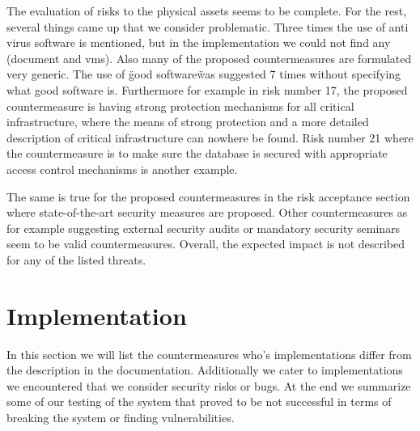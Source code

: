 \documentclass{report}
\begin{document}
The evaluation of risks to the physical assets seems to be complete. For the rest, several things came up that we consider problematic. Three times the use of anti virus software is mentioned, but in the implementation we could not find any (document and vms). Also many of the proposed countermeasures are formulated very generic. The use of \"good software\" was suggested 7 times without specifying what good software is. Furthermore for example in risk number 17, the proposed countermeasure is having strong protection mechanisms for all critical infrastructure, where the means of strong protection and a more detailed description of critical infrastructure can nowhere be found. Risk number 21 where the countermeasure is to make sure the database is secured with appropriate access control mechanisms is another example.

The same is true for the proposed countermeasures in the risk acceptance section where state-of-the-art security measures are proposed. Other countermeasures as for example suggesting external security audits or mandatory security seminars seem to be valid countermeasures. Overall, the expected impact is not described for any of the listed threats.

\section{Implementation}

In this section we will list the countermeasures who's implementations differ from the description in the documentation. Additionally we cater to implementations we encountered that we consider security risks or bugs. At the end we summarize some of our testing of the system that proved to be not successful in terms of breaking the system or finding vulnerabilities.
\end{document}
